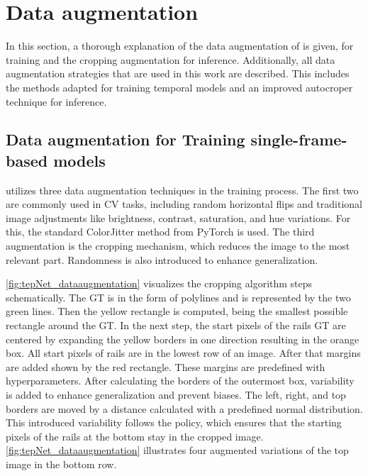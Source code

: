 \section{Data augmentation}
\label{sec:dataaugmentation}

In this section, a thorough explanation of the data augmentation of \cite{tepNet2024} is given, for training and the cropping augmentation for inference.
Additionally, all data augmentation strategies that are used in this work are described.
This includes the methods adapted for training temporal models and an improved autocroper technique for inference.

\subsection{Data augmentation for Training single-frame-based models}

\cite{tepNet2024} utilizes three data augmentation techniques in the training process.
The first two are commonly used in \ac{CV} tasks, including random horizontal flips and traditional image adjustments like brightness, contrast, saturation, and hue variations.
For this, the standard ColorJitter \cite{pytorch_colorJitter_docu} method from PyTorch is used.
The third augmentation is the cropping mechanism, which reduces the image to the most relevant part.
Randomness is also introduced to enhance generalization.

\autoref{fig:tepNet_dataaugmentation} visualizes the cropping algorithm steps schematically.
The \ac{GT} is in the form of polylines and is represented by the two green lines.
Then the yellow rectangle is computed, being the smallest possible rectangle around the \ac{GT}.
In the next step, the start pixels of the rails \ac{GT} are centered by expanding the yellow borders in one direction resulting in the orange box.
All start pixels of rails are in the lowest row of an image.
After that margins are added shown by the red rectangle.
These margins are predefined with hyperparameters.
After calculating the borders of the outermost box, variability is added to enhance generalization and prevent biases.
The left, right, and top borders are moved by a distance calculated with a predefined normal distribution.
This introduced variability follows the policy, which ensures that the starting pixels of the rails at the bottom stay in the cropped image.
\autoref{fig:tepNet_dataaugmentation} illustrates four augmented variations of the top image in the bottom row.

